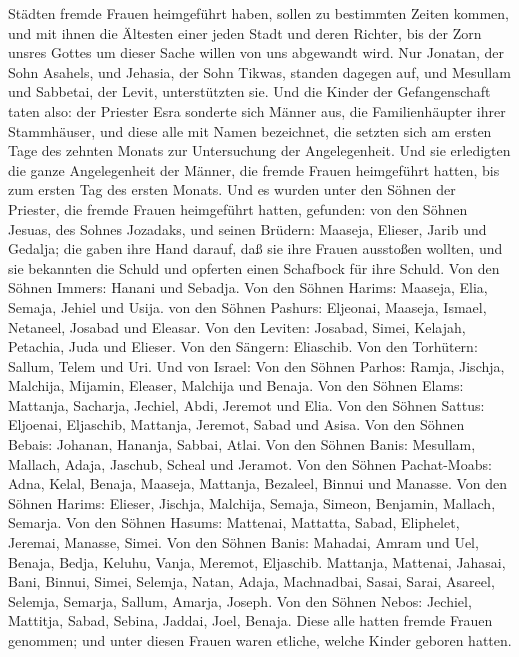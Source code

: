 Städten fremde Frauen heimgeführt haben, sollen zu bestimmten Zeiten
kommen, und mit ihnen die Ältesten einer jeden Stadt und deren Richter,
bis der Zorn unsres Gottes um dieser Sache willen von uns abgewandt
wird.  Nur Jonatan, der Sohn Asahels, und Jehasia, der
Sohn Tikwas, standen dagegen auf, und Mesullam und Sabbetai, der Levit,
unterstützten sie.  Und die Kinder der Gefangenschaft
taten also: der Priester Esra sonderte sich Männer aus, die
Familienhäupter ihrer Stammhäuser, und diese alle mit Namen bezeichnet,
die setzten sich am ersten Tage des zehnten Monats zur Untersuchung der
Angelegenheit.  Und sie erledigten die ganze
Angelegenheit der Männer, die fremde Frauen heimgeführt hatten, bis zum
ersten Tag des ersten Monats.  Und es wurden unter den
Söhnen der Priester, die fremde Frauen heimgeführt hatten, gefunden: von
den Söhnen Jesuas, des Sohnes Jozadaks, und seinen Brüdern: Maaseja,
Elieser, Jarib und Gedalja;  die gaben ihre Hand darauf,
daß sie ihre Frauen ausstoßen wollten, und sie bekannten die Schuld und
opferten einen Schafbock für ihre Schuld.  Von den Söhnen
Immers: Hanani und Sebadja.  Von den Söhnen Harims:
Maaseja, Elia, Semaja, Jehiel und Usija.  von den Söhnen
Pashurs: Eljeonai, Maaseja, Ismael, Netaneel, Josabad und Eleasar.
 Von den Leviten: Josabad, Simei, Kelajah, Petachia, Juda
und Elieser.  Von den Sängern: Eliaschib. Von den
Torhütern: Sallum, Telem und Uri.  Und von Israel: Von
den Söhnen Parhos: Ramja, Jischja, Malchija, Mijamin, Eleaser, Malchija
und Benaja.  Von den Söhnen Elams: Mattanja, Sacharja,
Jechiel, Abdi, Jeremot und Elia.  Von den Söhnen Sattus:
Eljoenai, Eljaschib, Mattanja, Jeremot, Sabad und Asisa. 
Von den Söhnen Bebais: Johanan, Hananja, Sabbai, Atlai. 
Von den Söhnen Banis: Mesullam, Mallach, Adaja, Jaschub, Scheal und
Jeramot.  Von den Söhnen Pachat-Moabs: Adna, Kelal,
Benaja, Maaseja, Mattanja, Bezaleel, Binnui und Manasse. 
Von den Söhnen Harims: Elieser, Jischja, Malchija, Semaja, Simeon,
 Benjamin, Mallach, Semarja.  Von den
Söhnen Hasums: Mattenai, Mattatta, Sabad, Eliphelet, Jeremai, Manasse,
Simei.  Von den Söhnen Banis: Mahadai, Amram und Uel,
 Benaja, Bedja, Keluhu,  Vanja, Meremot,
Eljaschib.  Mattanja, Mattenai, Jahasai, 
Bani, Binnui, Simei,  Selemja, Natan, Adaja,
 Machnadbai, Sasai, Sarai,  Asareel,
Selemja, Semarja,  Sallum, Amarja, Joseph.
 Von den Söhnen Nebos: Jechiel, Mattitja, Sabad, Sebina,
Jaddai, Joel, Benaja.  Diese alle hatten fremde Frauen
genommen; und unter diesen Frauen waren etliche, welche Kinder geboren
hatten.
